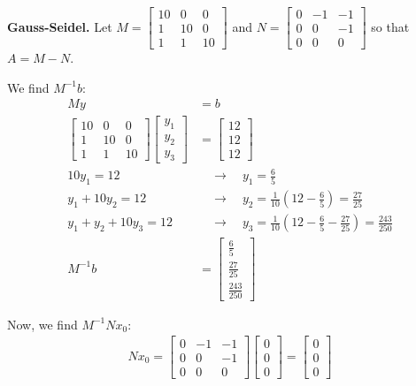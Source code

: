 \documentclass[12pt]{article}
\begin{document}
\newpage
\textbf{Gauss-Seidel.} Let $M = \begin{bmatrix} 10 & 0 & 0 \\ 1 & 10 & 0 \\ 1 & 1 & 10 \end{bmatrix}$ and $N = \begin{bmatrix} 0 & -1 & -1 \\ 0 & 0 & -1 \\ 0 & 0 & 0 \end{bmatrix}$ so that $A=M-N$.

We find $M^{-1}b$:
\begin{align*}
    My &= b \\
    \begin{bmatrix} 10 & 0 & 0 \\ 1 & 10 & 0 \\ 1 & 1 & 10 \end{bmatrix}
    \begin{bmatrix} y_1 \\ y_2 \\ y_3 \end{bmatrix} &=
    \begin{bmatrix} 12 \\ 12 \\ 12 \end{bmatrix} \\
    10y_1 = 12 &\quad\longrightarrow\quad y_1 = \frac{6}{5} \\[1.5ex]
    y_1 + 10y_2 = 12 &\quad\longrightarrow\quad y_2 = \frac{1}{10}(12 - \frac{6}{5}) = \frac{27}{25} \\[1.5ex]
    y_1 + y_2 + 10y_3 = 12 &\quad\longrightarrow\quad y_3 = \frac{1}{10}(12 - \frac{6}{5} - \frac{27}{25}) = \frac{243}{250} \\[1.5ex]
    M^{-1}b &= \begin{bmatrix} \frac{6}{5} \\[1.5ex] \frac{27}{25} \\[1.5ex] \frac{243}{250} \end{bmatrix}
\end{align*}

Now, we find $M^{-1}Nx_0$:
\begin{align*}
    Nx_0 = \begin{bmatrix} 0 & -1 & -1 \\ 0 & 0 & -1 \\ 0 & 0 & 0 \end{bmatrix} \begin{bmatrix} 0 \\ 0 \\ 0 \end{bmatrix} 
    = \begin{bmatrix} 0 \\ 0 \\ 0 \end{bmatrix}
\end{align*}
\end{document}

